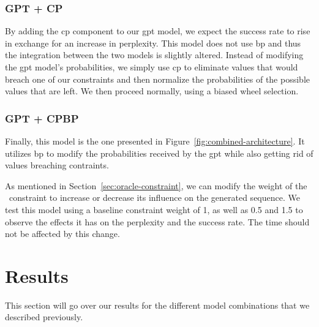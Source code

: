 \documentclass[../Document.tex]{subfiles}
\begin{document}
\subsubsection{GPT + CP}
By adding the \gls{cp} component to our \gls{gpt} model, we expect the success rate to rise in exchange for an increase in perplexity.
This model does not use \gls{bp} and thus the integration between the two models is slightly altered.
Instead of modifying the \gls{gpt} model's probabilities, we simply use \gls{cp} to eliminate values that would breach one of our constraints and then normalize the probabilities of the possible values that are left.
We then proceed normally, using a biased wheel selection.

\subsubsection{GPT + CPBP}
Finally, this model is the one presented in Figure~\ref{fig:combined-architecture}.
It utilizes \gls{bp} to modify the probabilities received by the \gls{gpt} while also getting rid of values breaching contraints.

As mentioned in Section~\ref{sec:oracle-constraint}, we can modify the weight of the \oracle\ constraint to increase or decrease its influence on the generated sequence.
We test this model using a baseline constraint weight of 1, as well as 0.5 and 1.5 to observe the effects it has on the perplexity and the success rate. The time should not be affected by this change.


\section{Results}
This section will go over our results for the different model combinations that we described previously.
\end{document}
